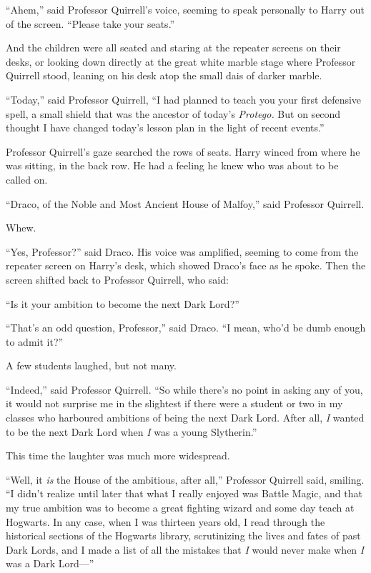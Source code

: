 “Ahem,” said Professor Quirrell’s voice, seeming to speak personally to Harry out of the screen. “Please take your seats.”

\later

And the children were all seated and staring at the repeater screens on their desks, or looking down directly at the great white marble stage where Professor Quirrell stood, leaning on his desk atop the small dais of darker marble.

“Today,” said Professor Quirrell, “I had planned to teach you your first defensive spell, a small shield that was the ancestor of today’s \emph{Protego.} But on second thought I have changed today’s lesson plan in the light of recent events.”

Professor Quirrell’s gaze searched the rows of seats. Harry winced from where he was sitting, in the back row. He had a feeling he knew who was about to be called on.

“Draco, of the Noble and Most Ancient House of Malfoy,” said Professor Quirrell.

Whew.

“Yes, Professor?” said Draco. His voice was amplified, seeming to come from the repeater screen on Harry’s desk, which showed Draco’s face as he spoke. Then the screen shifted back to Professor Quirrell, who said:

“Is it your ambition to become the next Dark Lord?”

“That’s an odd question, Professor,” said Draco. “I mean, who’d be dumb enough to admit it?”

A few students laughed, but not many.

“Indeed,” said Professor Quirrell. “So while there’s no point in asking any of you, it would not surprise me in the slightest if there were a student or two in my classes who harboured ambitions of being the next Dark Lord. After all, \emph{I} wanted to be the next Dark Lord when \emph{I} was a young Slytherin.”

This time the laughter was much more widespread.

“Well, it \emph{is} the House of the ambitious, after all,” Professor Quirrell said, smiling. “I didn’t realize until later that what I really enjoyed was Battle Magic, and that my true ambition was to become a great fighting wizard and some day teach at Hogwarts. In any case, when I was thirteen years old, I read through the historical sections of the Hogwarts library, scrutinizing the lives and fates of past Dark Lords, and I made a list of all the mistakes that \emph{I} would never make when \emph{I} was a Dark Lord—”

